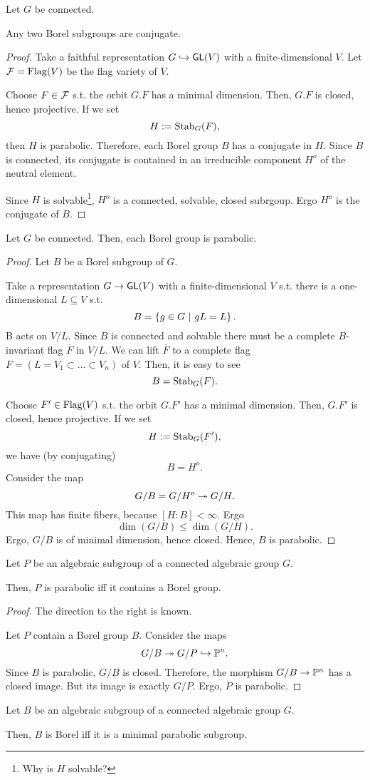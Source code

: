 \begin{theorem}
	Let $G$ be connected.
	 
	Any two Borel subgroups are conjugate.
\end{theorem}
\begin{proof}
Take a faithful representation $G \overset{}{\hookrightarrow} \textsf{GL}(V)$ with a finite-dimensional $V$. Let $\mathcal{F} = \mathrm{Flag}(V)$ be the flag variety of $V$.

Choose $F \in \mathcal{F}$ s.t. the orbit $G.F$ has a minimal dimension. Then, $G.F$ is closed, hence projective. If we set
\[ H:= \mathrm{Stab}_G(F), \]
then $H$ is parabolic. Therefore, each Borel group $B$ has a conjugate in $H$. Since $B$ is connected, its conjugate is contained in an irreducible component $H^o$ of the neutral element.

Since $H$ is solvable\footnote{Why is $H$ solvable?}, $H^o$ is a connected, solvable, closed subrgoup. Ergo $H^o$ is the conjugate of $B$.
\end{proof}
\begin{proposition}
Let $G$ be connected. Then, each Borel group is parabolic.
\end{proposition}
\begin{proof}
	Let $B$ be a Borel subgroup of $G$.
	
	Take a representation $G \overset{}{\rightarrow} \textsf{GL}(V)$ with a finite-dimensional $V$ s.t. there is a one-dimensional $L \subseteq V$ s.t.
	\[ B = \left\lbrace g \in G ~ | ~ gL = L\right\rbrace.\]
	B acts on $V/L$. Since $B$ is connected and solvable there must be a complete $B$-invariant flag $\overline{F}$ in $V/L$. We can lift $\overline{F}$ to a complete flag $F = (L=V_1 \subset \ldots \subset V_n)$ of $V$. Then, it is easy to see
	\[  B= \mathrm{Stab}_G(F). \]
	
	Choose $F' \in \mathrm{Flag}(V)$ s.t. the orbit $G.F'$ has a minimal dimension. Then, $G.F'$ is closed, hence projective. If we set
	\[ H:= \mathrm{Stab}_G(F'), \]
	we have (by conjugating)
	\[ B = H^o.\]
	Consider the map
	\[ G/B = G/H^o \overset{}{\twoheadrightarrow} G/H. \]
	This map has finite fibers, because $[H: B] < \infty$. Ergo
	\[ \dim(G / B) \leq \dim(G/H). \]
	Ergo, $G/B$ is of minimal dimension, hence closed. Hence, $B$ is parabolic.
\end{proof}
\begin{corollary}
	Let $P$ be an algebraic subgroup of a connected algebraic group $G$.
	
	Then, $P$ is parabolic iff it contains a Borel group.
\end{corollary}
\begin{proof}
	The direction to the right is known.
	
	Let $P$ contain a Borel group $B$. Consider the maps
	\[ G / B \overset{}{\twoheadrightarrow} G /P \overset{}{\hookrightarrow} \mathbb{P}^n. \]
	Since $B$ is parabolic, $G/B$ is closed. Therefore, the morphism $G / B \overset{}{\rightarrow} \mathbb{P}^n$ has a closed image. But its image is exactly $G/P$. Ergo, $P$ is parabolic.
\end{proof}
\begin{corollary}
	Let $B$ be an algebraic subgroup of a connected algebraic group $G$.
	
	Then, $B$ is Borel iff it is a minimal parabolic subgroup.
\end{corollary}

